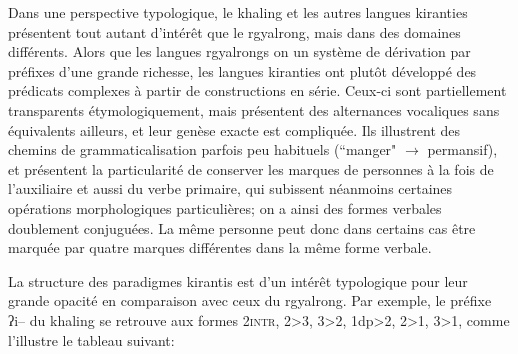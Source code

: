 \documentclass[oldfontcommands,oneside,a4paper,11pt]{memoir}
\newcommand{\ipa}[1]{{\phon #1}} %
\begin{document}
Dans une perspective typologique, le khaling et les autres langues kiranties présentent tout autant d'intérêt que le rgyalrong, mais dans des domaines différents. Alors que les langues rgyalrongs on un système de dérivation par préfixes  d'une grande richesse, les langues kiranties ont plutôt développé des prédicats complexes à partir de constructions en série. Ceux-ci sont partiellement transparents étymologiquement, mais présentent des alternances vocaliques sans équivalents ailleurs, et leur genèse exacte est compliquée. Ils illustrent des chemins de grammaticalisation parfois peu habituels (``manger" $\rightarrow$ permansif), et présentent la particularité de conserver les marques de personnes à la fois de l'auxiliaire et aussi du verbe primaire, qui subissent néanmoins certaines opérations morphologiques particulières; on a ainsi des formes verbales doublement conjuguées. La même personne peut donc dans certains cas être marquée par quatre marques différentes dans la même forme verbale.


La structure des paradigmes kirantis est d'un intérêt typologique pour leur grande opacité en comparaison avec ceux du rgyalrong. Par exemple, le préfixe \ipa{ʔi--} du khaling se retrouve aux formes \textsc{2intr}, 2>3, 3>2, 1dp>2, 2>1, 3>1, comme l'illustre le tableau suivant:
\end{document}

